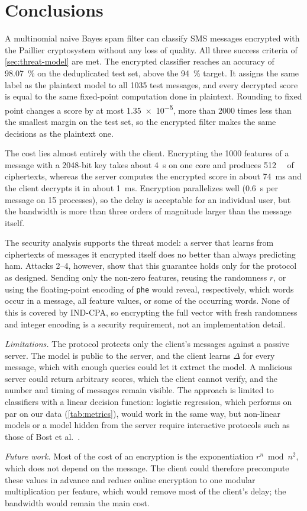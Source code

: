 \section{Conclusions}\label{sec:conclusions}

A multinomial naive Bayes spam filter can classify SMS messages encrypted with the Paillier cryptosystem without any loss of quality.
All three success criteria of \cref{sec:threat-model} are met.
The encrypted classifier reaches an accuracy of \SI{98.07}{\percent} on the deduplicated test set, above the \SI{94}{\percent} target.
It assigns the same label as the plaintext model to all \num{1035} test messages, and every decrypted score is equal to the same fixed-point computation done in plaintext.
Rounding to fixed point changes a score by at most \num{1.35e-5}, more than \num{2000} times less than the smallest margin on the test set, so the encrypted filter makes the same decisions as the plaintext one.

The cost lies almost entirely with the client.
Encrypting the \num{1000} features of a message with a \num{2048}-bit key takes about \SI{4}{\second} on one core and produces \SI{512}{\kilo\byte} of ciphertexts, whereas the server computes the encrypted score in about \SI{74}{\milli\second} and the client decrypts it in about \SI{1}{\milli\second}.
Encryption parallelizes well (\SI{0.6}{\second} per message on 15 processes), so the delay is acceptable for an individual user, but the bandwidth is more than three orders of magnitude larger than the message itself.

The security analysis supports the threat model: a server that learns from ciphertexts of messages it encrypted itself does no better than always predicting ham.
Attacks 2--4, however, show that this guarantee holds only for the protocol as designed.
Sending only the non-zero features, reusing the randomness $r$, or using the floating-point encoding of \texttt{phe} would reveal, respectively, which words occur in a message, all feature values, or some of the occurring words.
None of this is covered by IND-CPA, so encrypting the full vector with fresh randomness and integer encoding is a security requirement, not an implementation detail.

\textit{Limitations.}
The protocol protects only the client's messages against a passive server.
The model is public to the server, and the client learns $\Delta$ for every message, which with enough queries could let it extract the model.
A malicious server could return arbitrary scores, which the client cannot verify, and the number and timing of messages remain visible.
The approach is limited to classifiers with a linear decision function: logistic regression, which performs on par on our data (\cref{tab:metrics}), would work in the same way, but non-linear models or a model hidden from the server require interactive protocols such as those of Bost et al.~\cite{bost2015}.

\textit{Future work.}
Most of the cost of an encryption is the exponentiation ${r^n \bmod n^2}$, which does not depend on the message.
The client could therefore precompute these values in advance and reduce online encryption to one modular multiplication per feature, which would remove most of the client's delay; the bandwidth would remain the main cost.
